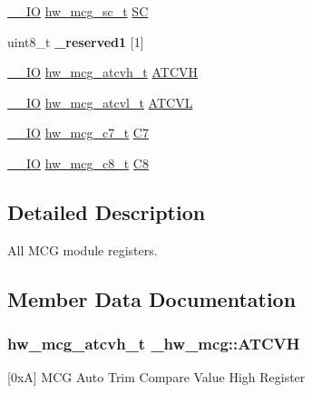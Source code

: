 \begin{DoxyCompactItemize}
\item 
\hyperlink{core__sc300_8h_aec43007d9998a0a0e01faede4133d6be}{\+\_\+\+\_\+\+IO} \hyperlink{union__hw__mcg__sc}{hw\+\_\+mcg\+\_\+sc\+\_\+t} \hyperlink{struct__hw__mcg_a00fba9e45e5186dc56941c74b4073505}{SC}
\item 
uint8\+\_\+t {\bfseries \+\_\+reserved1} \mbox{[}1\mbox{]}\hypertarget{struct__hw__mcg_a5f93b6959061ee3a1a993fd4b7acfce4}{}\label{struct__hw__mcg_a5f93b6959061ee3a1a993fd4b7acfce4}

\item 
\hyperlink{core__sc300_8h_aec43007d9998a0a0e01faede4133d6be}{\+\_\+\+\_\+\+IO} \hyperlink{union__hw__mcg__atcvh}{hw\+\_\+mcg\+\_\+atcvh\+\_\+t} \hyperlink{struct__hw__mcg_abdd7b2f05589aac266beb6862ee12807}{A\+T\+C\+VH}
\item 
\hyperlink{core__sc300_8h_aec43007d9998a0a0e01faede4133d6be}{\+\_\+\+\_\+\+IO} \hyperlink{union__hw__mcg__atcvl}{hw\+\_\+mcg\+\_\+atcvl\+\_\+t} \hyperlink{struct__hw__mcg_ad4ada20faa1096979657af99f68b0040}{A\+T\+C\+VL}
\item 
\hyperlink{core__sc300_8h_aec43007d9998a0a0e01faede4133d6be}{\+\_\+\+\_\+\+IO} \hyperlink{union__hw__mcg__c7}{hw\+\_\+mcg\+\_\+c7\+\_\+t} \hyperlink{struct__hw__mcg_af69a42a91c944cdb467f91b0afff2ff6}{C7}
\item 
\hyperlink{core__sc300_8h_aec43007d9998a0a0e01faede4133d6be}{\+\_\+\+\_\+\+IO} \hyperlink{union__hw__mcg__c8}{hw\+\_\+mcg\+\_\+c8\+\_\+t} \hyperlink{struct__hw__mcg_a725495a70c87403fd7d1cdd5187ad585}{C8}
\end{DoxyCompactItemize}


\subsection{Detailed Description}
All M\+CG module registers. 

\subsection{Member Data Documentation}
\subsubsection[{\texorpdfstring{A\+T\+C\+VH}{ATCVH}}]{ {\bf hw\+\_\+mcg\+\_\+atcvh\+\_\+t} \+\_\+hw\+\_\+mcg\+::\+A\+T\+C\+VH}\hypertarget{struct__hw__mcg_abdd7b2f05589aac266beb6862ee12807}{}\label{struct__hw__mcg_abdd7b2f05589aac266beb6862ee12807}
\mbox{[}0xA\mbox{]} M\+CG Auto Trim Compare Value High Register 
